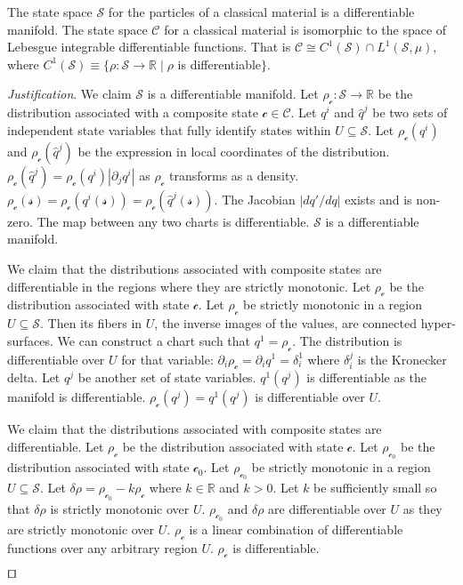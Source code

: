\documentclass[smallextended]{svjour3}
\numberwithin{equation}{section}
\newenvironment{justification}{\emph{Justification}.}{\hfill\(\qed\)}
\begin{document}
\begin{prop}\label{prop:differentiable_manifold}
	The state space $\mathcal{S}$ for the particles of a  classical material is a differentiable manifold. The state space $\mathcal{C}$ for a classical material is isomorphic to the space of Lebesgue integrable differentiable functions. That is $\mathcal{C} \cong C^1(\mathcal{S}) \cap L^1(\mathcal{S}, \mu)$, where $C^1(\mathcal{S}) \equiv \{\rho:\mathcal{S} \rightarrow \mathbb{R} \; | \; \rho$ is differentiable$\}$.
\end{prop}
\begin{justification}
	We claim $\mathcal{S}$ is a differentiable manifold. Let $\rho_\mathcal{c} : \mathcal{S} \rightarrow \mathbb{R}$ be the distribution associated with a composite state $\mathcal{c} \in \mathcal{C}$. Let $q^i$ and $\hat{q}^j$ be two sets of independent state variables that fully identify states within $U\subseteq \mathcal{S}$. Let $\rho_\mathcal{c}(q^i)$ and $\rho_\mathcal{c}(\hat{q}^j)$ be the expression in local coordinates of the distribution.  $\rho_\mathcal{c}(\hat{q}^j)=\rho_\mathcal{c}(q^i) | \partial_j q^i |$ as $\rho_\mathcal{c}$ transforms as a density. $\rho_\mathcal{c}(\mathcal{s}) = \rho_\mathcal{c}(q^i(\mathcal{s})) = \rho_\mathcal{c}(\hat{q}^j(\mathcal{s}))$. The Jacobian $| d q' / d q |$ exists and is non-zero. The map between any two charts is differentiable. $\mathcal{S}$ is a differentiable manifold.
	
	We claim that the distributions associated with composite states are differentiable in the regions where they are strictly monotonic. Let $\rho_\mathcal{c}$ be the distribution associated with state $\mathcal{c}$. Let $\rho_\mathcal{c}$ be strictly monotonic in a region $U\subseteq \mathcal{S}$. Then its fibers in $U$, the inverse images of the values, are connected hyper-surfaces. We can construct a chart such that $q^1=\rho_\mathcal{c}$. The distribution is differentiable over $U$ for that variable: $\partial_{i} \rho_\mathcal{c} = \partial_{i} q^1 = \delta_i^1$ where $\delta_i^j$ is the Kronecker delta. Let $q^{j}$ be another set of state variables. $q^1(q^{j})$ is differentiable as the manifold is differentiable. $\rho_\mathcal{c}(q^{j})=q^1(q^{j})$ is differentiable over $U$.
	
	We claim that the distributions associated with composite states are differentiable. Let $\rho_\mathcal{c}$ be the distribution associated with state $\mathcal{c}$. Let $\rho_{\mathcal{c}_0}$ be the distribution associated with state $\mathcal{c}_0$. Let $\rho_{\mathcal{c}_0}$ be strictly monotonic in a region $U\subseteq \mathcal{S}$. Let $\delta \rho = \rho_{\mathcal{c}_0} - k \rho_{\mathcal{c}}$ where $k \in \mathbb{R}$ and $k>0$. Let $k$ be sufficiently small so that $\delta \rho$ is strictly monotonic over $U$. $\rho_{\mathcal{c}_0}$ and $\delta \rho$ are differentiable over $U$ as they are strictly monotonic over $U$. $\rho_{\mathcal{c}}$ is a linear combination of differentiable functions over any arbitrary region $U$. $\rho_{\mathcal{c}}$ is differentiable.
	

\end{justification}
\end{document}
